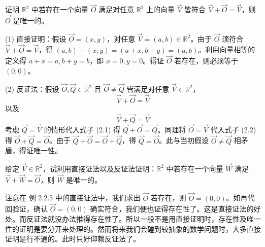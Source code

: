 \begin{example}
证明 $\mathbb{R}^{2}$ 中若存在一个向量 $\overrightarrow{O}$ 满足对任意 $\mathbb{R}^{2}$ 上的向量 $\overrightarrow{V}$ 皆符合 $\overrightarrow{V} + \overrightarrow{O} = \overrightarrow{V}$，则 $\overrightarrow{O}$ 是唯一的。
\end{example}

(1) 直接证明：假设 $\overrightarrow{O} = (x, y)$，对任意 $\overrightarrow{V} = (a, b) \in \mathbb{R}^{2}$。由于 $\overrightarrow{O}$ 须符合 $\overrightarrow{V} + \overrightarrow{O} = \overrightarrow{V}$，得 $(a, b) + (x, y) = (a + x, b + y) = (a, b)$。利用向量相等的定义得 $a + x = a, b + y = b$，即 $x = 0, y = 0$。得证 $\overrightarrow{O}$ 若存在，则必须等于 $(0, 0)$。

(2) 反证法：假设 $\overrightarrow{O}, \overrightarrow{Q} \in \mathbb{R}^{2}$ 且 $\overrightarrow{O} \neq \overrightarrow{Q}$ 皆满足对任意 $\overrightarrow{V} \in \mathbb{R}^{2}$，
\begin{equation}
    \overrightarrow{V} + \overrightarrow{O} = \overrightarrow{V}
\end{equation}
以及
\begin{equation}
    \overrightarrow{V} + \overrightarrow{Q} = \overrightarrow{V}
\end{equation}
考虑 $\overrightarrow{Q} = \overrightarrow{V}$ 的情形代入式子 (2.1) 得 $\overrightarrow{Q} + \overrightarrow{O} = \overrightarrow{Q}$。同理将 $\overrightarrow{O} = \overrightarrow{V}$ 代入式子 (2.2) 得 $\overrightarrow{O} + \overrightarrow{Q} = \overrightarrow{O}$。由于 $\overrightarrow{Q} + \overrightarrow{O} = \overrightarrow{O} + \overrightarrow{Q}$，得 $\overrightarrow{Q} = \overrightarrow{O}$。此与当初假设 $\overrightarrow{O} \neq \overrightarrow{Q}$ 相矛盾，得证唯一性。

\begin{question}
给定 $\overrightarrow{V} \in \mathbb{R}^{2}$，试利用直接证法以及反证法证明：$\mathbb{R}^{2}$ 中若存在一个向量 $\overrightarrow{W}$ 满足 $\overrightarrow{V} + \overrightarrow{W} = \overrightarrow{O}$，则 $\overrightarrow{W}$ 是唯一的。
\end{question}

注意在 例 2.2.5 中的直接证法中，我们求出 $\overrightarrow{O}$ 若存在，则 $\overrightarrow{O} = (0, 0)$。如再代回验证，确认 $\overrightarrow{O} = (0, 0)$ 确实符合，我们便也证得存在性了。这是直接证法的好处。而反证法就没办法推得存在性了。所以一般不是用直接证明时，存在性及唯一性的证明是要分开来处理的。然而将来我们会碰到较抽象的数学问题时，大多直接证明是行不通的。此时只好仰赖反证法了。

